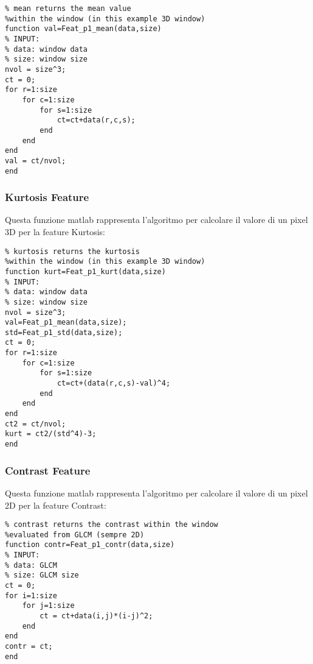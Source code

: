 \begin{lstlisting}
% mean returns the mean value 
%within the window (in this example 3D window)
function val=Feat_p1_mean(data,size)
% INPUT: 
% data: window data
% size: window size
nvol = size^3;
ct = 0;
for r=1:size
	for c=1:size
		for s=1:size
			ct=ct+data(r,c,s);
		end
	end
end
val = ct/nvol;
end
\end{lstlisting}

\subsubsection{Kurtosis Feature}
\label{kurtosiscode}
Questa funzione matlab rappresenta l'algoritmo per calcolare il valore di un pixel 3D per la feature Kurtosis:

\begin{lstlisting}
% kurtosis returns the kurtosis 
%within the window (in this example 3D window)
function kurt=Feat_p1_kurt(data,size)
% INPUT: 
% data: window data
% size: window size
nvol = size^3;
val=Feat_p1_mean(data,size);
std=Feat_p1_std(data,size);
ct = 0;
for r=1:size
	for c=1:size
		for s=1:size
			ct=ct+(data(r,c,s)-val)^4;
		end
	end
end
ct2 = ct/nvol;
kurt = ct2/(std^4)-3;
end
\end{lstlisting}

\subsubsection{Contrast Feature}
\label{contrastcode}
Questa funzione matlab rappresenta l'algoritmo per calcolare il valore di un pixel 2D per la feature Contrast:
\begin{lstlisting}
% contrast returns the contrast within the window
%evaluated from GLCM (sempre 2D)
function contr=Feat_p1_contr(data,size)
% INPUT: 
% data: GLCM
% size: GLCM size
ct = 0;
for i=1:size
	for j=1:size
		ct = ct+data(i,j)*(i-j)^2;
	end
end
contr = ct;
end
\end{lstlisting}
